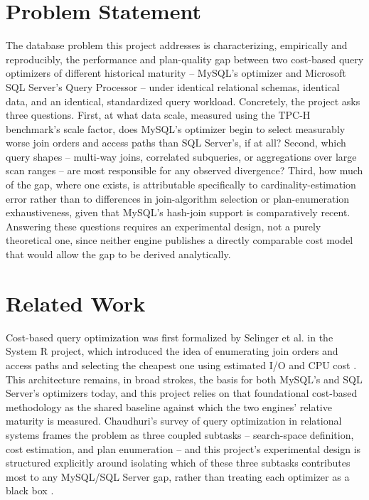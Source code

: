 \documentclass[conference]{IEEEtran}
\begin{document}
\section{Problem Statement}
The database problem this project addresses is characterizing, empirically and reproducibly, the performance and plan-quality gap between two cost-based query optimizers of different historical maturity -- MySQL's optimizer and Microsoft SQL Server's Query Processor -- under identical relational schemas, identical data, and an identical, standardized query workload. Concretely, the project asks three questions. First, at what data scale, measured using the TPC-H benchmark's scale factor, does MySQL's optimizer begin to select measurably worse join orders and access paths than SQL Server's, if at all? Second, which query shapes -- multi-way joins, correlated subqueries, or aggregations over large scan ranges -- are most responsible for any observed divergence? Third, how much of the gap, where one exists, is attributable specifically to cardinality-estimation error rather than to differences in join-algorithm selection or plan-enumeration exhaustiveness, given that MySQL's hash-join support is comparatively recent. Answering these questions requires an experimental design, not a purely theoretical one, since neither engine publishes a directly comparable cost model that would allow the gap to be derived analytically.

\section{Related Work}
Cost-based query optimization was first formalized by Selinger et al. in the System R project, which introduced the idea of enumerating join orders and access paths and selecting the cheapest one using estimated I/O and CPU cost \cite{selinger1979}. This architecture remains, in broad strokes, the basis for both MySQL's and SQL Server's optimizers today, and this project relies on that foundational cost-based methodology as the shared baseline against which the two engines' relative maturity is measured. Chaudhuri's survey of query optimization in relational systems frames the problem as three coupled subtasks -- search-space definition, cost estimation, and plan enumeration -- and this project's experimental design is structured explicitly around isolating which of these three subtasks contributes most to any MySQL/SQL Server gap, rather than treating each optimizer as a black box \cite{chaudhuri1998}.
\end{document}
